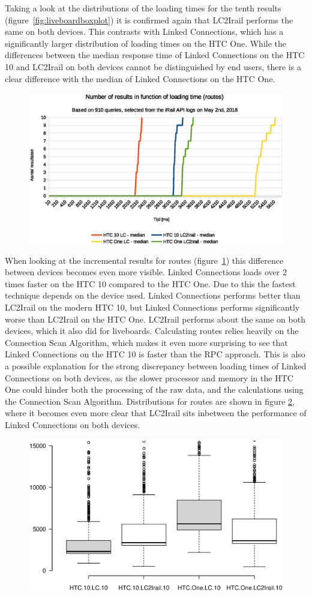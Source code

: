 \documentclass[twocolumn]{phdsymp} %
\begin{document}
Taking a look at the distributions of the loading times for the tenth results (figure~\ref{fig:liveboardboxplot}) it is confirmed again that LC2Irail performs the same on both devices. This contrasts with Linked Connections, which has a significantly larger distribution of loading times on the HTC One. While the differences between the median response time of Linked Connections on the HTC 10 and LC2Irail on both devices cannot be distinguished by end users, there is a clear difference with the median of Linked Connections on the HTC One.

\begin{figure}[ht]
	\begin{center}
		\includegraphics[width=.50\textwidth]{images/dief_routes_average.eps}
		\caption{\label{fig:route} }
	\end{center}
\end{figure}

When looking at the incremental results for routes (figure~\ref{fig:route}) this difference between devices becomes even more visible. Linked Connections loads over 2 times
faster on the HTC 10 compared to the HTC One. Due to this the fastest technique depends on the device used. Linked Connections performs better than LC2Irail on the modern HTC 10, but Linked Connections performs significantly worse than LC2Irail on the HTC One. LC2Irail performs about the same on both devices, which it also did for liveboards. Calculating routes relies heavily on the Connection Scan Algorithm, which makes it even more surprising to see that Linked Connections on the HTC 10 is faster than the RPC approach. This is also a possible explanation for the strong discrepancy between loading times of Linked Connections on both devices, as the slower processor and memory in the HTC One could hinder both the processing of the raw data, and the calculations using the Connection Scan Algorithm. Distributions for routes are shown in figure \ref{fig:routebox}, where it becomes even more clear that LC2Irail sits inbetween the performance of Linked Connections on both devices.

\begin{figure}[ht]
	\begin{center}
		\includegraphics[trim=3cm 4cm 0 0, width=.50\textwidth]{images/boxplot_routes_10.eps}
		\caption{\label{fig:routebox} }
	\end{center}
\end{figure}
\end{document}
